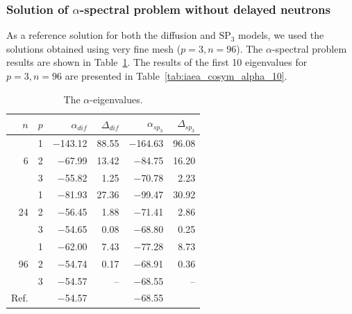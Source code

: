 \documentclass[authoryear]{elsarticle}
\begin{document}
\subsubsection{Solution of $\alpha$-spectral problem without delayed neutrons}
As a reference solution for both the diffusion and  $\mathrm{SP_3}$ models, we used the solutions obtained using very fine mesh ($p = 3, n = 96$).
The $\alpha$-spectral problem results are shown in Table~\ref{tab:iaea_cosym_alpha}.
The results of the first 10 eigenvalues for $ p = 3, n = 96 $ are presented in Table~\ref{tab:iaea_cosym_alpha_10}.

\begin{table}[h]
\caption{The $\alpha$-eigenvalues.}
\label{tab:iaea_cosym_alpha}
\begin{center}
\begin{tabular}{rrrrrr}
\hline
$n$ & $p$ & $\alpha_{dif}$ & $\Delta_{dif}$ &$\alpha_{sp_3}$& $\Delta_{sp_3}$ \\
\hline
	& 1	&$-$143.12 &  88.55 & $-$164.63& 96.08\\
6	& 2	& $-$67.99 &  13.42 & $-$84.75 & 16.20\\
	& 3	& $-$55.82 &   1.25 & $-$70.78 &  2.23\\ 
\hline
	& 1	& $-$81.93 &  27.36 & $-$99.47 & 30.92\\
24& 2	& $-$56.45 &   1.88 & $-$71.41 & 2.86\\
	& 3	& $-$54.65 &   0.08 & $-$68.80 & 0.25\\ 
\hline
	& 1	& $-$62.00 &   7.43 & $-$77.28 & 8.73\\
96& 2	& $-$54.74 &   0.17 & $-$68.91 & 0.36\\
	& 3	& $-$54.57 &	   -- & $-$68.55 & -- \\ 
\hline
Ref.& & $-$54.57 & & $-$68.55 \\ 
\hline
\end{tabular}
\end{center}
\end{table}
\end{document}
